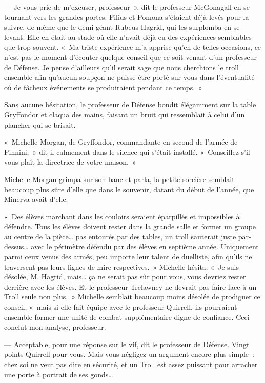 --- Je vous prie de m'excuser, professeur~», dit le professeur McGonagall en se tournant vers les grandes portes. Filius et Pomona s'étaient déjà levés pour la suivre, de même que le demi-géant Rubeus Hagrid, qui les surplomba en se levant. Elle en était au stade où elle n'avait déjà eu des expériences semblables que trop souvent. «~Ma triste expérience m'a apprise qu'en de telles occasions, ce n'est pas le moment d'écouter quelque conseil que ce soit venant d'un professeur de Défense. Je pense d'ailleurs qu'il serait sage que nous cherchions le troll ensemble afin qu'aucun soupçon ne puisse être porté sur vous dans l'éventualité où de fâcheux événements se produiraient pendant ce temps.~»

Sans aucune hésitation, le professeur de Défense bondit élégamment sur la table Gryffondor et claqua des mains, faisant un bruit qui ressemblait à celui d'un plancher qui se brisait.

«~Michelle Morgan, de Gryffondor, commandante en second de l'armée de Pinnini,~» dit-il calmement dans le silence qui s'était installé. «~Conseillez s'il vous plaît la directrice de votre maison.~»

Michelle Morgan grimpa sur son banc et parla, la petite sorcière semblait beaucoup plus sûre d'elle que dans le souvenir, datant du début de l'année, que Minerva avait d'elle.

«~Des élèves marchant dans les couloirs seraient éparpillés et impossibles à défendre. Tous les élèves doivent rester dans la grande salle et former un groupe au centre de la pièce… pas entourés par des tables, un troll sauterait juste par-dessus… avec le périmètre défendu par des élèves en septième année. Uniquement parmi ceux venus des armés, peu importe leur talent de duelliste, afin qu'ils ne traversent pas leurs lignes de mire respectives.~» Michelle hésita. «~Je suis désolée, M. Hagrid, mais… ça ne serait pas sûr pour vous, vous devriez rester derrière avec les élèves. Et le professeur Trelawney ne devrait pas faire face à un Troll seule non plus,~» Michelle semblait beaucoup moins désolée de prodiguer ce conseil, «~mais si elle fait équipe avec le professeur Quirrell, ils pourraient ensemble former une unité de combat supplémentaire digne de confiance. Ceci conclut mon analyse, professeur.

--- Acceptable, pour une réponse sur le vif, dit le professeur de Défense. Vingt points Quirrell pour vous. Mais vous négligez un argument encore plus simple~: chez soi ne veut pas dire en sécurité, et un Troll est assez puissant pour arracher une porte à portrait de ses gonds…

